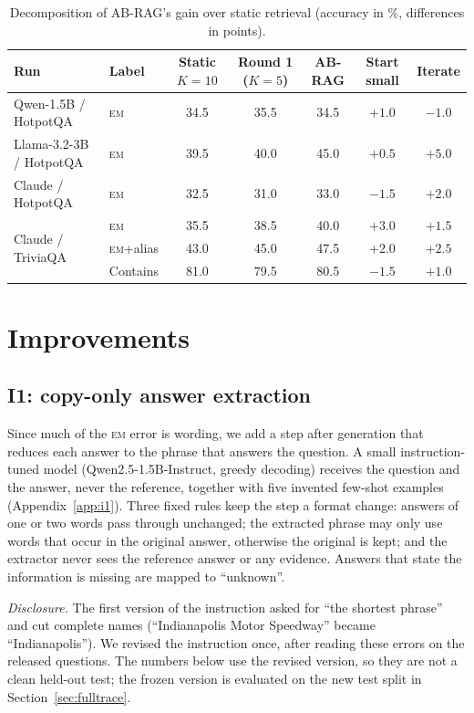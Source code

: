 \documentclass[11pt]{article}
\newcommand{\EM}{\textsc{em}}
\begin{document}
\begin{table}[t]
\centering
\small
\begin{tabular}{llccccc}
\toprule
Run & Label & Static $K{=}10$ & Round 1 ($K{=}5$) & AB-RAG & Start small & Iterate \\
\midrule
Qwen-1.5B / HotpotQA & \EM{} & 34.5 & 35.5 & 34.5 & $+1.0$ & $-1.0$ \\
Llama-3.2-3B / HotpotQA & \EM{} & 39.5 & 40.0 & 45.0 & $+0.5$ & $+5.0$ \\
Claude / HotpotQA & \EM{} & 32.5 & 31.0 & 33.0 & $-1.5$ & $+2.0$ \\
\multirow{3}{*}{Claude / TriviaQA} & \EM{} & 35.5 & 38.5 & 40.0 & $+3.0$ & $+1.5$ \\
& \EM{}+alias & 43.0 & 45.0 & 47.5 & $+2.0$ & $+2.5$ \\
& Contains & 81.0 & 79.5 & 80.5 & $-1.5$ & $+1.0$ \\
\bottomrule
\end{tabular}
\caption{Decomposition of AB-RAG's gain over static retrieval (accuracy in \%, differences in points).}
\label{tab:decomp}
\end{table}

\section{Improvements}
\label{sec:improve}

\subsection{I1: copy-only answer extraction}
\label{sec:i1}

Since much of the \EM{} error is wording, we add a step after generation that reduces each answer to the phrase that answers the question. A small instruction-tuned model (Qwen2.5-1.5B-Instruct, greedy decoding) receives the question and the answer, never the reference, together with five invented few-shot examples (Appendix~\ref{app:i1}). Three fixed rules keep the step a format change: answers of one or two words pass through unchanged; the extracted phrase may only use words that occur in the original answer, otherwise the original is kept; and the extractor never sees the reference answer or any evidence. Answers that state the information is missing are mapped to ``unknown''.

\emph{Disclosure.} The first version of the instruction asked for ``the shortest phrase'' and cut complete names (``Indianapolis Motor Speedway'' became ``Indianapolis''). We revised the instruction once, after reading these errors on the released questions. The numbers below use the revised version, so they are not a clean held-out test; the frozen version is evaluated on the new test split in Section~\ref{sec:fulltrace}.
\end{document}
